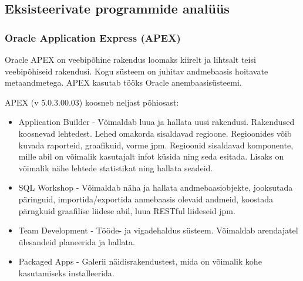 \documentclass[a4paper,12pt]{article} %
\begin{document}
\subsection{Eksisteerivate programmide analüüs}
\subsubsection{Oracle Application Express (APEX)}
Oracle APEX on veebipõhine rakendus loomaks kiirelt ja lihtsalt teisi veebipõhiseid rakendusi. Kogu süsteem on juhitav andmebaasis hoitavate metaandmetega. APEX kasutab tööks Oracle anembaasisüsteemi.\par
APEX (v 5.0.3.00.03) koosneb neljast põhiosast:
\begin{itemize}
\item Application Builder - Võimaldab luua ja hallata uusi rakendusi. Rakendused koosnevad lehtedest. Lehed omakorda sisaldavad regioone. Regioonides võib kuvada raporteid, graafikuid, vorme jpm. Regioonid sisaldavad komponente, mille abil on võimalik kasutajalt infot küsida ning seda esitada. Lisaks on võimalik nähe lehtede statistikat ning hallata seadeid.
\item SQL Workshop - Võimaldab näha ja hallata andmebaasiobjekte, jooksutada päringuid, importida/exportida anmebaasis olevaid andmeid, koostada pärngkuid graafilise liidese abil, luua RESTful liideseid jpm.
\item Team Development - Tööde- ja vigadehaldus süsteem. Võimaldab arendajatel ülesandeid planeerida ja hallata.
\item Packaged Apps - Galerii näidisrakendustest, mida on võimalik kohe kasutamiseks installeerida.
\end{itemize}
\cite{Oracle_APEX}
\end{document}
